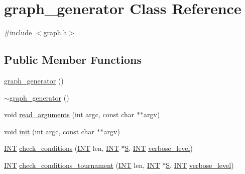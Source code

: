 \hypertarget{classgraph__generator}{}\section{graph\+\_\+generator Class Reference}
\label{classgraph__generator}


{\ttfamily \#include $<$graph.\+h$>$}

\subsection*{Public Member Functions}
\begin{DoxyCompactItemize}
\item 
\mbox{\hyperlink{classgraph__generator_a6a8c40385bd0da26f4cacb3d6ff0931a}{graph\+\_\+generator}} ()
\item 
\mbox{\hyperlink{classgraph__generator_a863028a4162a3fdb10b2d79dd89dff9c}{$\sim$graph\+\_\+generator}} ()
\item 
void \mbox{\hyperlink{classgraph__generator_a4d4c4f3feccde9f3162bd342b0bf4800}{read\+\_\+arguments}} (int argc, const char $\ast$$\ast$argv)
\item 
void \mbox{\hyperlink{classgraph__generator_acd2ec07214d869173eb1c9ffb3ec0312}{init}} (int argc, const char $\ast$$\ast$argv)
\item 
\mbox{\hyperlink{galois_8h_a09fddde158a3a20bd2dcadb609de11dc}{I\+NT}} \mbox{\hyperlink{classgraph__generator_a0e74d900ad772c4f39500aa4eccbaee0}{check\+\_\+conditions}} (\mbox{\hyperlink{galois_8h_a09fddde158a3a20bd2dcadb609de11dc}{I\+NT}} len, \mbox{\hyperlink{galois_8h_a09fddde158a3a20bd2dcadb609de11dc}{I\+NT}} $\ast$\mbox{\hyperlink{simeon_8_c_adab47f8243f1b5a2c31df2535d6b37d0}{S}}, \mbox{\hyperlink{galois_8h_a09fddde158a3a20bd2dcadb609de11dc}{I\+NT}} \mbox{\hyperlink{simeon_8_c_a818073fbcc2f439e7c56952f67386122}{verbose\+\_\+level}})
\item 
\mbox{\hyperlink{galois_8h_a09fddde158a3a20bd2dcadb609de11dc}{I\+NT}} \mbox{\hyperlink{classgraph__generator_ab2d3a1fcd6641f5e9243b20cda46a65f}{check\+\_\+conditions\+\_\+tournament}} (\mbox{\hyperlink{galois_8h_a09fddde158a3a20bd2dcadb609de11dc}{I\+NT}} len, \mbox{\hyperlink{galois_8h_a09fddde158a3a20bd2dcadb609de11dc}{I\+NT}} $\ast$\mbox{\hyperlink{simeon_8_c_adab47f8243f1b5a2c31df2535d6b37d0}{S}}, \mbox{\hyperlink{galois_8h_a09fddde158a3a20bd2dcadb609de11dc}{I\+NT}} \mbox{\hyperlink{simeon_8_c_a818073fbcc2f439e7c56952f67386122}{verbose\+\_\+level}})
\item 

\end{DoxyCompactItemize}
